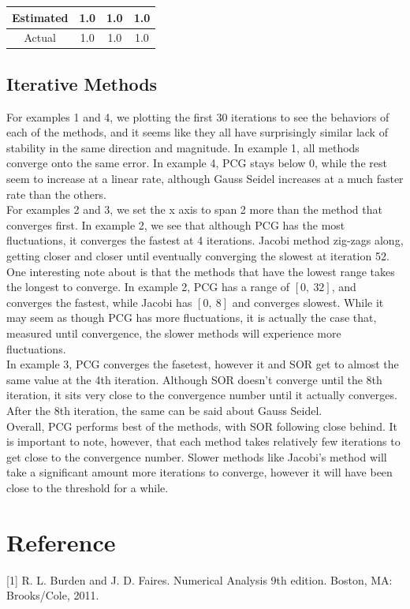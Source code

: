 \documentclass[11pt]{article}	%
\begin{document}
\begin{center}
	 \label{tab:title}
    \begin{tabular}{||c|c|c|c||}
        \hline
        Estimated & 1.0 & 1.0 &  1.0 \\ [.25em]
        \hline\hline
        Actual & 1.0 & 1.0 & 1.0 \\ [.25em]
        \hline
    \end{tabular}
\end{center}

\subsection{Iterative Methods}
For examples 1 and 4, we plotting the first 30 iterations to see the behaviors of each of the methods, and it seems like they all have surprisingly similar lack of stability in the same direction and magnitude. In example 1, all methods converge onto the same error. In example 4, PCG stays below 0, while the rest seem to increase at a linear rate, although Gauss Seidel increases at a much faster rate than the others.\\

\noindent For examples 2 and 3, we set the x axis to span 2 more than the method that converges first. In example 2, we see that although PCG has the most fluctuations, it converges the fastest at 4 iterations. Jacobi method zig-zags along, getting closer and closer until eventually converging the slowest at iteration 52.\\

\noindent One interesting note about is that the methods that have the lowest range takes the longest to converge. In example 2, PCG has a range of $[0, ~32]$, and converges the fastest, while Jacobi has $[0, ~8]$ and converges slowest. While it may seem as though PCG has more fluctuations, it is actually the case that, measured until convergence, the slower methods will experience more fluctuations.\\

\noindent In example 3, PCG converges the fasetest, however it and SOR get to almost the same value at the 4th iteration. Although SOR doesn't converge until the 8th iteration, it sits very close to the convergence number until it actually converges. After the 8th iteration, the same can be said about Gauss Seidel. \\

\noindent Overall, PCG performs best of the methods, with SOR following close behind. It is important to note, however, that each method takes relatively few iterations to get close to the convergence number. Slower methods like Jacobi's method will take a significant amount more iterations to converge, however it will have been close to the threshold for a while.

\section{Reference}
[1] R. L. Burden and J. D. Faires. Numerical Analysis 9th edition. Boston, MA: Brooks/Cole, 2011.
\end{document}
